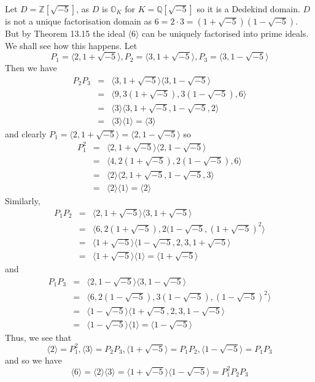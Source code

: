 \begin{example} Let $D=\mathbb{Z}[\sqrt{-5}]$, as $D$ is $\mathbb{O}_K$ for $K=\mathbb{Q}[\sqrt{-5}]$ so it is a
Dedekind domain. $D$ is not a unique factorisation domain as $6=2 \cdot 3=(1+\sqrt{-5})(1-\sqrt{-5})$. But by Theorem 13.15 the ideal $\langle 6 \rangle$ can be uniquely factorised into prime ideals. We shall see how this happens.
Let
$$P_1=\langle 2,1+\sqrt{-5} \rangle, P_2=\langle 3,1+\sqrt{-5} \rangle, P_3=\langle 3,1-\sqrt{-5} \rangle$$
Then we have
\begin{eqnarray*}
P_2P_3&=&\langle 3,1+\sqrt{-5} \rangle \langle 3,1-\sqrt{-5} \rangle\\
&=& \langle 9, 3(1+\sqrt{-5}),3(1-\sqrt{-5}),6 \rangle\\
&=& \langle 3 \rangle \langle 3,1+\sqrt{-5},1-\sqrt{-5},2 \rangle\\
&=&\langle 3 \rangle \langle 1 \rangle =\langle 3 \rangle
\end{eqnarray*}
and clearly $P_1=\langle 2,1+\sqrt{-5} \rangle=\langle 2,1-\sqrt{-5} \rangle$ so
\begin{eqnarray*}
P^2_1&=&\langle 2,1+\sqrt{-5} \rangle \langle 2,1-\sqrt{-5} \rangle\\
&=&\langle 4,2(1+\sqrt{-5}),2(1-\sqrt{-5}),6 \rangle\\
&=&\langle 2\rangle \langle 2,1+\sqrt{-5}, 1-\sqrt{-5},3\rangle \\
&=&\langle 2\rangle \langle 1 \rangle= \langle 2 \rangle
\end{eqnarray*}
Similarly,
\begin{eqnarray*}
P_1P_2&=&\langle 2,1+\sqrt{-5} \rangle \langle 3,1+\sqrt{-5} \rangle\\
&=&\langle 6,2(1+\sqrt{-5}),2(1-\sqrt{-5},(1+\sqrt{-5})^2 \rangle\\
&=&\langle 1+\sqrt{-5} \rangle \langle 1-\sqrt{-5},2,3,1+\sqrt{-5} \rangle\\
&=&\langle 1+\sqrt{-5} \rangle \langle 1\rangle=\langle 1+\sqrt{-5} \rangle
\end{eqnarray*}
and
\begin{eqnarray*}
P_1P_3&=&\langle 2,1-\sqrt{-5} \rangle \langle 3,1-\sqrt{-5} \rangle\\
&=&\langle 6,2(1-\sqrt{-5}),3(1-\sqrt{-5}),(1-\sqrt{-5})^2 \rangle\\
&=&\langle 1-\sqrt{-5} \rangle \langle 1+\sqrt{-5},2,3,1-\sqrt{-5} \rangle\\
&=&\langle 1-\sqrt{-5} \rangle \langle 1\rangle=\langle 1-\sqrt{-5} \rangle
\end{eqnarray*}
Thus, we see that
$$\langle 2 \rangle =P^2_1, \langle 3 \rangle =P_2P_3,
\langle 1+\sqrt{-5} \rangle =P_1P_2, \langle 1-\sqrt{-5} \rangle =P_1P_3$$
and so we have
$$\langle 6 \rangle =\langle 2 \rangle \langle 3 \rangle =\langle 1+\sqrt{-5} \rangle \langle 1-\sqrt{-5} \rangle
=P^2_1P_2P_3$$
\end{example}
